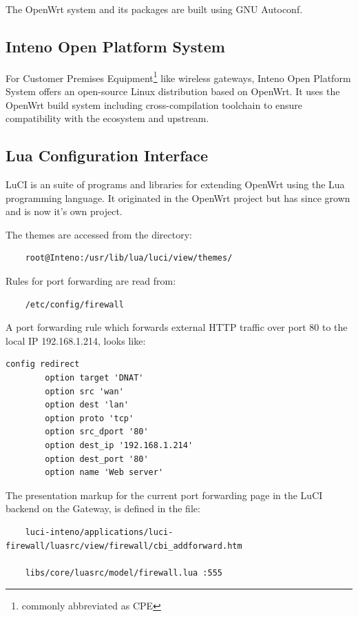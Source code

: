 \documentclass[a4paper,11pt]{kth-mag}
\begin{document}
The OpenWrt system and its packages are built using GNU Autoconf.

\subsection{Inteno Open Platform System}
For Customer Premises Equipment\footnote{commonly abbreviated as CPE} like wireless gateways, Inteno Open Platform System offers an open-source Linux distribution based on OpenWrt.
It uses the OpenWrt build system including cross-compilation toolchain to ensure compatibility with the ecosystem and upstream.

\subsection{Lua Configuration Interface}
LuCI is an suite of programs and libraries for extending OpenWrt using the Lua programming language.
It originated in the OpenWrt project but has since grown and is now it's own project.

The themes are accessed from the directory:

\begin{verbatim}
    root@Inteno:/usr/lib/lua/luci/view/themes/
\end{verbatim}

Rules for port forwarding are read from:

\begin{verbatim}
    /etc/config/firewall
\end{verbatim}

A port forwarding rule which forwards external HTTP traffic over port 80 to the local IP 192.168.1.214, looks like:

\begin{verbatim}
config redirect               
        option target 'DNAT' 
        option src 'wan'
        option dest 'lan'
        option proto 'tcp'
        option src_dport '80'
        option dest_ip '192.168.1.214'
        option dest_port '80' 
        option name 'Web server'
\end{verbatim}

The presentation markup for the current port forwarding page in the LuCI backend on the Gateway, is defined in the file:

\begin{verbatim}
    luci-inteno/applications/luci-firewall/luasrc/view/firewall/cbi_addforward.htm

    libs/core/luasrc/model/firewall.lua :555
\end{verbatim}
\end{document}
